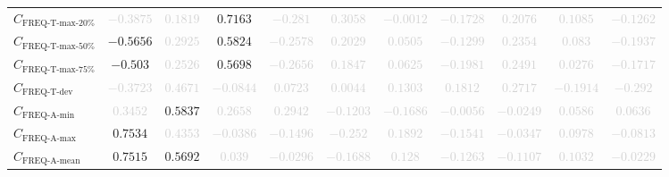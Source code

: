\documentclass{standalone}
\newcommand{\freqmaxtwentyname}{\text{FREQ-T-max-20\%}}
\newcommand{\freqmaxtwenty}{C_{\freqmaxtwentyname}}
\newcommand{\freqmaxfiftyname}{\text{FREQ-T-max-50\%}}
\newcommand{\freqmaxfifty}{C_{\freqmaxfiftyname}}
\newcommand{\freqmaxseventyfivename}{\text{FREQ-T-max-75\%}}
\newcommand{\freqmaxseventyfive}{C_{\freqmaxseventyfivename}}
\newcommand{\freqdevname}{\text{FREQ-T-dev}}
\newcommand{\freqdev}{C_{\freqdevname}}
\newcommand{\actfreqminname}{\text{FREQ-A-min}}
\newcommand{\actfreqmin}{C_{\actfreqminname}}
\newcommand{\actfreqmaxname}{\text{FREQ-A-max}}
\newcommand{\actfreqmax}{C_{\actfreqmaxname}}
\newcommand{\actfreqmeanname}{\text{FREQ-A-mean}}
\newcommand{\actfreqmean}{C_{\actfreqmeanname}}
\begin{document}
\begin{tabular}{lcccccccccc}
$\freqmaxtwenty$ & \textcolor{lightgray}{$-0.3875$} & \textcolor{lightgray}{$0.1819$} & $0.7163$ & \textcolor{lightgray}{$-0.281$} & \textcolor{lightgray}{$0.3058$} & \textcolor{lightgray}{$-0.0012$} & \textcolor{lightgray}{$-0.1728$} & \textcolor{lightgray}{$0.2076$} & \textcolor{lightgray}{$0.1085$} & \textcolor{lightgray}{$-0.1262$} \\ 
$\freqmaxfifty$ & $-0.5656$ & \textcolor{lightgray}{$0.2925$} & $0.5824$ & \textcolor{lightgray}{$-0.2578$} & \textcolor{lightgray}{$0.2029$} & \textcolor{lightgray}{$0.0505$} & \textcolor{lightgray}{$-0.1299$} & \textcolor{lightgray}{$0.2354$} & \textcolor{lightgray}{$0.083$} & \textcolor{lightgray}{$-0.1937$} \\ 
$\freqmaxseventyfive$ & $-0.503$ & \textcolor{lightgray}{$0.2526$} & $0.5698$ & \textcolor{lightgray}{$-0.2656$} & \textcolor{lightgray}{$0.1847$} & \textcolor{lightgray}{$0.0625$} & \textcolor{lightgray}{$-0.1981$} & \textcolor{lightgray}{$0.2491$} & \textcolor{lightgray}{$0.0276$} & \textcolor{lightgray}{$-0.1717$} \\ 
$\freqdev$ & \textcolor{lightgray}{$-0.3723$} & \textcolor{lightgray}{$0.4671$} & \textcolor{lightgray}{$-0.0844$} & \textcolor{lightgray}{$0.0723$} & \textcolor{lightgray}{$0.0044$} & \textcolor{lightgray}{$0.1303$} & \textcolor{lightgray}{$0.1812$} & \textcolor{lightgray}{$0.2717$} & \textcolor{lightgray}{$-0.1914$} & \textcolor{lightgray}{$-0.292$} \\ 
$\actfreqmin$ & \textcolor{lightgray}{$0.3452$} & $0.5837$ & \textcolor{lightgray}{$0.2658$} & \textcolor{lightgray}{$0.2942$} & \textcolor{lightgray}{$-0.1203$} & \textcolor{lightgray}{$-0.1686$} & \textcolor{lightgray}{$-0.0056$} & \textcolor{lightgray}{$-0.0249$} & \textcolor{lightgray}{$0.0586$} & \textcolor{lightgray}{$0.0636$} \\ 
$\actfreqmax$ & $0.7534$ & \textcolor{lightgray}{$0.4353$} & \textcolor{lightgray}{$-0.0386$} & \textcolor{lightgray}{$-0.1496$} & \textcolor{lightgray}{$-0.252$} & \textcolor{lightgray}{$0.1892$} & \textcolor{lightgray}{$-0.1541$} & \textcolor{lightgray}{$-0.0347$} & \textcolor{lightgray}{$0.0978$} & \textcolor{lightgray}{$-0.0813$} \\ 
$\actfreqmean$ & $0.7515$ & $0.5692$ & \textcolor{lightgray}{$0.039$} & \textcolor{lightgray}{$-0.0296$} & \textcolor{lightgray}{$-0.1688$} & \textcolor{lightgray}{$0.128$} & \textcolor{lightgray}{$-0.1263$} & \textcolor{lightgray}{$-0.1107$} & \textcolor{lightgray}{$0.1032$} & \textcolor{lightgray}{$-0.0229$} \\ 

\end{tabular}
\end{document}
